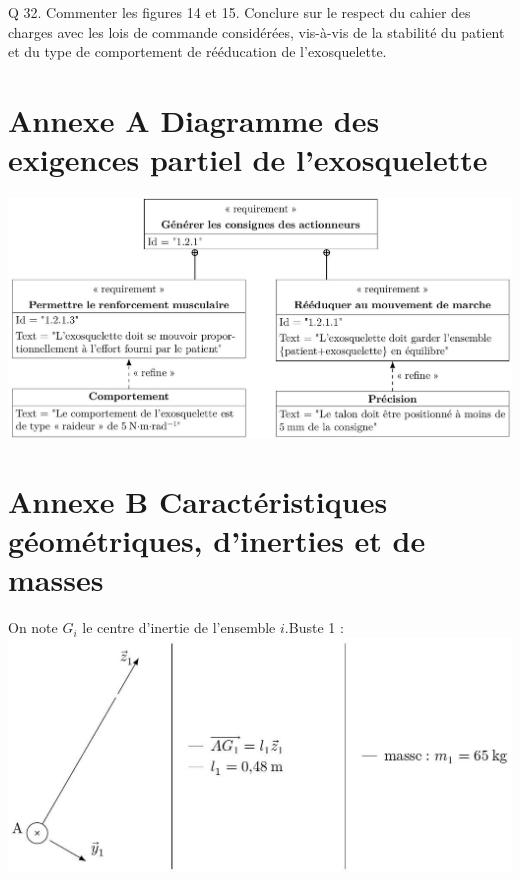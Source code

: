 \documentclass[10pt]{article}
\begin{document}
Q 32. Commenter les figures 14 et 15. Conclure sur le respect du cahier des charges avec les lois de commande considérées, vis-à-vis de la stabilité du patient et du type de comportement de rééducation de l'exosquelette.

\section*{Annexe A Diagramme des exigences partiel de l'exosquelette}
\begin{center}
\includegraphics[max width=\textwidth]{2025_07_03_97545f5dc188959e5663g-13(3)}
\end{center}

\section*{Annexe B Caractéristiques géométriques, d'inerties et de masses}
 On note $G_{i}$ le centre d'inertie de l'ensemble $i$.Buste 1 :\\
\includegraphics[max width=\textwidth, center]{2025_07_03_97545f5dc188959e5663g-13(2)}
\end{document}
